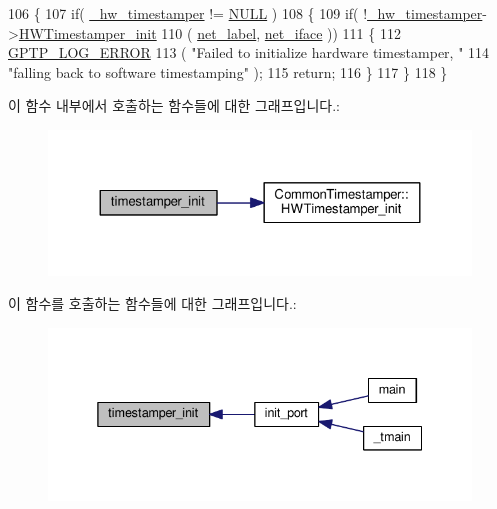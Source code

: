 \begin{DoxyCode}
106 \{
107     \textcolor{keywordflow}{if}( \hyperlink{class_common_port_a6b964d49ce26b21cc984b14102973f87}{\_hw\_timestamper} != \hyperlink{openavb__types__base__pub_8h_a070d2ce7b6bb7e5c05602aa8c308d0c4}{NULL} )
108     \{
109         \textcolor{keywordflow}{if}( !\hyperlink{class_common_port_a6b964d49ce26b21cc984b14102973f87}{\_hw\_timestamper}->\hyperlink{class_common_timestamper_abde0de8253fd960807f7f2816c0c5225}{HWTimestamper\_init}
110             ( \hyperlink{class_common_port_a5885d7a835513edd0bbb0a170b4c9f01}{net\_label}, \hyperlink{class_common_port_a7bc95d8cb3e95a8e7f9c5dc261289e37}{net\_iface} ))
111         \{
112             \hyperlink{gptp__log_8hpp_afefbb1009717c128012bfeed94842987}{GPTP\_LOG\_ERROR}
113                 ( \textcolor{stringliteral}{"Failed to initialize hardware timestamper, "}
114                   \textcolor{stringliteral}{"falling back to software timestamping"} );
115             \textcolor{keywordflow}{return};
116         \}
117     \}
118 \}
\end{DoxyCode}


이 함수 내부에서 호출하는 함수들에 대한 그래프입니다.\+:
\nopagebreak
\begin{figure}[H]
\begin{center}
\leavevmode
\includegraphics[width=324pt]{class_common_port_a64530a2fb5ad64bdc7e61b2e37791191_cgraph}
\end{center}
\end{figure}




이 함수를 호출하는 함수들에 대한 그래프입니다.\+:
\nopagebreak
\begin{figure}[H]
\begin{center}
\leavevmode
\includegraphics[width=338pt]{class_common_port_a64530a2fb5ad64bdc7e61b2e37791191_icgraph}
\end{center}
\end{figure}


